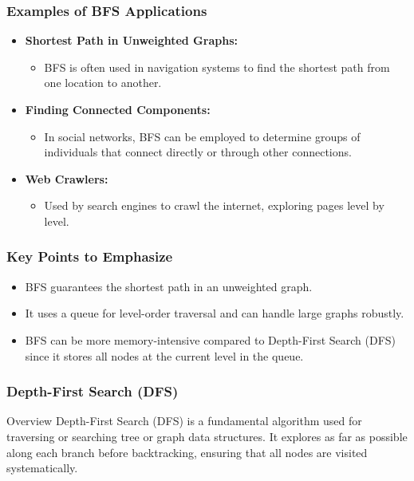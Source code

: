 \documentclass[aspectratio=169]{beamer}
\begin{document}
\begin{frame}[fragile]
    \frametitle{Examples of BFS Applications}
    \begin{itemize}
        \item \textbf{Shortest Path in Unweighted Graphs:}
            \begin{itemize}
                \item BFS is often used in navigation systems to find the shortest path from one location to another.
            \end{itemize}
        \item \textbf{Finding Connected Components:}
            \begin{itemize}
                \item In social networks, BFS can be employed to determine groups of individuals that connect directly or through other connections.
            \end{itemize}
        \item \textbf{Web Crawlers:}
            \begin{itemize}
                \item Used by search engines to crawl the internet, exploring pages level by level.
            \end{itemize}
    \end{itemize}
\end{frame}

\begin{frame}[fragile]
    \frametitle{Key Points to Emphasize}
    \begin{itemize}
        \item BFS guarantees the shortest path in an unweighted graph.
        \item It uses a queue for level-order traversal and can handle large graphs robustly.
        \item BFS can be more memory-intensive compared to Depth-First Search (DFS) since it stores all nodes at the current level in the queue.
    \end{itemize}
\end{frame}

\begin{frame}
    \frametitle{Depth-First Search (DFS)}
    \begin{block}{Overview}
        Depth-First Search (DFS) is a fundamental algorithm used for traversing or searching tree or graph data structures. 
        It explores as far as possible along each branch before backtracking, ensuring that all nodes are visited systematically.
    \end{block}
\end{frame}
\end{document}
